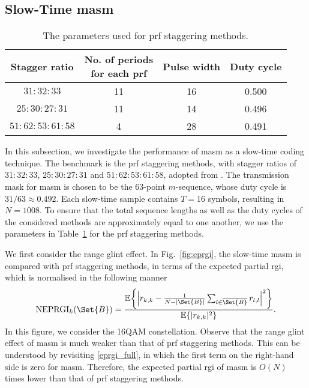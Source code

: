\documentclass[journal,a4paper,10pt, romanappendices]{IEEEtran}
\begin{document}
\subsection{Slow-Time \ac{masm}}
\begin{table}[t]
\caption{The parameters used for \ac{prf} staggering methods.}
    \label{tab:staggeredPRI}
    \centering
    \begin{tabular}{|c|c|c|c|} \hline
        Stagger ratio & \makecell{No. of periods \\ for each \ac{prf}} & Pulse width & Duty cycle \\ \hline
        $31:32:33$ & 11 & 16 & 0.500 \\ \hline
        $25:30:27:31$ & 11 & 14 & 0.496 \\ \hline
        $51:62:53:61:58$ & 4 & 28 & 0.491 \\ \hline
    \end{tabular}
    \vspace{-4mm}
\end{table}
In this subsection, we investigate the performance of \ac{masm} as a slow-time coding technique. The benchmark is the \ac{prf} staggering methods, with stagger ratios of $31:32:33$, $25:30:27:31$ and $51:62:53:61:58$, adopted from \cite[Sec.~15.9]{radar_handbook}. The transmission mask for \ac{masm} is chosen to be the 63-point $m$-sequence, whose duty cycle is $31/63\approx 0.492$. Each slow-time sample contains $T=16$ symbols, resulting in $N=1008$. To ensure that the total sequence lengths as well as the duty cycles of the considered methods are approximately equal to one another, we use the parameters in Table~\ref{tab:staggeredPRI} for the \ac{prf} staggering methods.

We first consider the range glint effect. In Fig.~\ref{fig:eprgi}, the slow-time \ac{masm} is compared with \ac{prf} staggering methods, in terms of the expected partial \ac{rgi}, which is normalised in the following manner
\begin{equation}
{\rm NEPRGI}_k(\Set{B}) = \frac{\mathbb{E}\bigg\{\Big|r_{k,k}-\frac{1}{N-|\Set{B}|}\sum_{l\in\overline{\Set{B}}}r_{l,l}\Big|^2\bigg\}}{\mathbb{E}\{|r_{k,k}|^2\}}.
\end{equation}
In this figure, we consider the 16QAM constellation. Observe that the range glint effect of \ac{masm} is much weaker than that of \ac{prf} staggering methods. This can be understood by revisiting \eqref{eprgi_full}, in which the first term on the right-hand side is zero for \ac{masm}. Therefore, the expected partial \ac{rgi} of \ac{masm} is $O(N)$ times lower than that of \ac{prf} staggering methods. 
\end{document}
